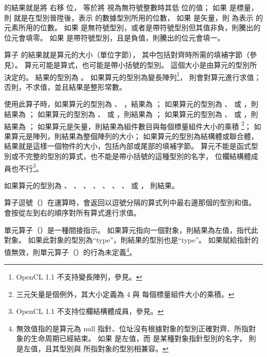 { 的結果就是將  右移  位，
  等於將  視為無符號整數時其低  位的值；
如果  是標量，則  就是在型別晉陞後，表示  的數據型別所用的位數，
如果  是矢量，則  為表示  的元素所用的位數。
如果  是無符號型別，或者是帶符號型別但其值非負，則騰出的位元會填零。
如果  是帶符號型別，且是負值，則騰出的位元會填一。
\stopitem

\startitem
算子  的結果就是算元的大小（單位字節），
其中包括對齊時所需的填補字節（參見）。
算元可能是算式，也可能是帶小括號的型別。
這個大小是由算元的型別所決定的。
結果的型別為 。
如果算元的型別為變長陣列\footnote{OpenCL 1.1 不支持變長陣列，參見。}，
則會對算元進行求值；
否則，不求值，並且結果是整形常數。

使用此算子時，如果算元的型別為 、 ，結果為 ；
如果算元的型別為 、  或 ，則結果為 ；
如果算元的型別為 、  或 ，則結果為 ；
如果算元的型別為 、  或 ，則結果為 ；
如果算元是矢量，則結果為組件數目與每個標量組件大小的乘積
\footnote{三元矢量是個例外，其大小定義為 4 與 每個標量組件大小的乘積。}；
如果算元是陣列，則結果為整個陣列的大小；
如果算元的型別為結構體或聯合體，結果就是這樣一個物件的大小，包括內部或尾部的填補字節。
算元不能是函式型別或不完整的型別的算式，也不能是帶小括號的這種型別的名字，
位欄結構體成員也不行\footnote{OpenCL 1.1 不支持位欄結構體成員，參見。}。

如果算元的型別為 、 、 、
 、 、 、
 、  或 ，
則結果。
\stopitem

\startitem
算子逗號（\ccmm{,}）在運算時，會返回以逗號分隔的算式列中最右邊那個的型別和值。
會按從左到右的順序對所有算式進行求值。
\stopitem

\startitem
單元算子（\ccmm{*}）是一種間接指示。
如果算元指向一個對象，則結果為左值，指代此對象。
如果此對象的型別為“type”，則結果的型別也是“type”。
如果賦給指針的值無效，則單元算子（\ccmm{*}）的行為未定義\footnote{
無效值指的是算元為 null 指針、位址沒有根據對象的型別正確對齊、所指對象的生命周期已經結束。
如果  是左值，而  是某種對象指針型別的名字，
則  是左值，且其型別與  所指對象的型別相兼容。
}。
\stopitem

}
